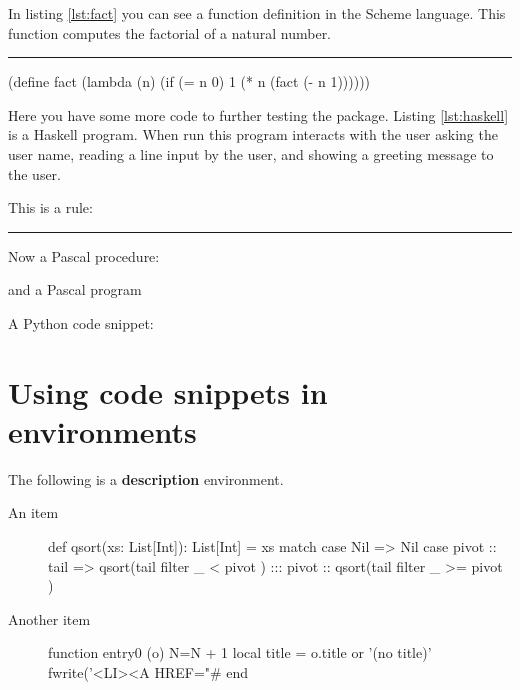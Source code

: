 \documentclass[10pt,a4paper]{article}
\begin{document}

In listing \ref{lst:fact} you can see a function definition in the
Scheme language. This function computes the factorial of a natural
number.
\newline\rule{\linewidth}{2pt}
\begin{pygmented}[
  sty=emacs,
  linenos,
  label=lst:fact,
  caption=A Scheme function.
  ]
(define fact
    (lambda (n)
        (if (= n 0)
            1
            (* n (fact (- n 1))))))
\end{pygmented}

Here you have some more code to further testing the package. Listing
\ref{lst:haskell} is a Haskell program. When run this program interacts
with the user asking the user name, reading a line input by the user,
and showing a greeting message to the user.


This is a rule:

\noindent\rule{\linewidth}{2pt}

Now a Pascal procedure:

and a Pascal program

A Python code snippet:


\section{Using code snippets in environments}

The following is a \textbf{description} environment.

\begin{description}
  \item[An item] \lipsum[31]
  \begin{pygmented}[lang=scala,colback=yellow,
    ]
def qsort(xs: List[Int]): List[Int] =
  xs match {
    case Nil =>
      Nil
    case pivot :: tail =>
      qsort(tail filter { _ < pivot }) :::
        pivot :: qsort(tail filter { _ >= pivot })
  }
  \end{pygmented}
  \lipsum[32]

  \item[Another item] \lipsum[33]
  \begin{pygmented}[lang=lua,colback=yellow]
function entry0 (o)
  N=N + 1
  local title = o.title or '(no title)'
  fwrite('<LI><A HREF="#%
end
  \end{pygmented}
  \lipsum[34]
\end{description}
\end{document}
